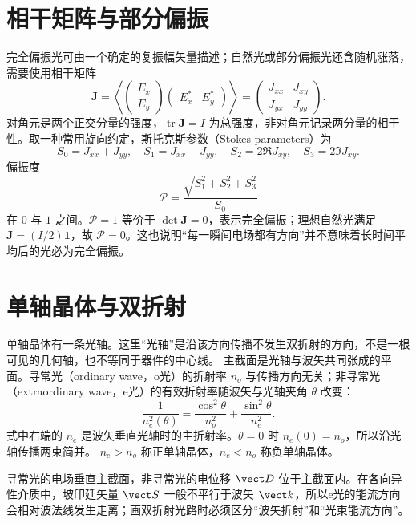 \section{相干矩阵与部分偏振}

完全偏振光可由一个确定的复振幅矢量描述；自然光或部分偏振光还含随机涨落，需要使用相干矩阵
\begin{equation}
 \mathbf J=
 \left\langle
 \begin{pmatrix}E_x\\E_y\end{pmatrix}
 \begin{pmatrix}E_x^*&E_y^*\end{pmatrix}
 \right\rangle
 =\begin{pmatrix}J_{xx}&J_{xy}\\J_{yx}&J_{yy}\end{pmatrix}.
\end{equation}
对角元是两个正交分量的强度，$\operatorname{tr}\mathbf J=I$ 为总强度，非对角元记录两分量的相干性。取一种常用旋向约定，斯托克斯参数（Stokes parameters）为
\begin{equation}
 S_0=J_{xx}+J_{yy},\quad S_1=J_{xx}-J_{yy},\quad
 S_2=2\Re J_{xy},\quad S_3=2\Im J_{xy}.
\end{equation}
偏振度
\begin{equation}
 \mathcal P=\frac{\sqrt{S_1^2+S_2^2+S_3^2}}{S_0}
\end{equation}
在 $0$ 与 $1$ 之间。$\mathcal P=1$ 等价于 $\det\mathbf J=0$，表示完全偏振；理想自然光满足 $\mathbf J=(I/2)\mathbf 1$，故 $\mathcal P=0$。这也说明“每一瞬间电场都有方向”并不意味着长时间平均后的光必为完全偏振。

\section{单轴晶体与双折射}

单轴晶体有一条光轴。这里“光轴”是沿该方向传播不发生双折射的方向，不是一根可见的几何轴，也不等同于器件的中心线。
主截面是光轴与波矢共同张成的平面。寻常光（ordinary wave，o光）的折射率 $n_o$ 与传播方向无关；非寻常光（extraordinary wave，e光）的有效折射率随波矢与光轴夹角 $\theta$ 改变：
\begin{equation}
 \frac1{n_e^2(\theta)}
 =\frac{\cos^2\theta}{n_o^2}+\frac{\sin^2\theta}{n_e^2}.
\end{equation}
式中右端的 $n_e$ 是波矢垂直光轴时的主折射率。$\theta=0$ 时 $n_e(0)=n_o$，所以沿光轴传播两束简并。
$n_e>n_o$ 称正单轴晶体，$n_e<n_o$ 称负单轴晶体。

寻常光的电场垂直主截面，非寻常光的电位移 $\vect D$ 位于主截面内。在各向异性介质中，坡印廷矢量
$\vect S$ 一般不平行于波矢 $\vect k$，所以e光的能流方向会相对波法线发生走离；画双折射光路时必须区分“波矢折射”和“光束能流方向”。

